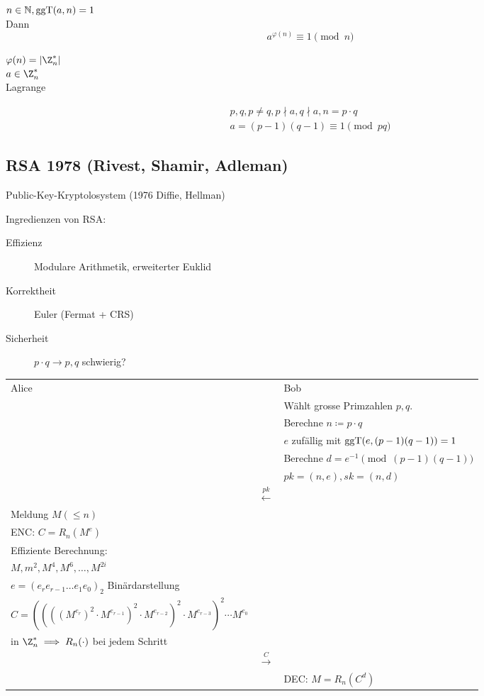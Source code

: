 \begin{satz*}[note = (Euler)]
	$n \in \mathbb{N} , \operatorname{ggT}(a,n) = 1$ \\
	Dann
	\[ a^{\varphi(n)} \equiv 1 \pmod n \]
	\begin{bew}
		$\varphi(n) = \abs{\Z_n^*}$\\
		$a \in \Z_n^*$\\
		Lagrange
	\end{bew}
\end{satz*}
\begin{bsp*}
	\begin{gather*}
		p , q , p \neq q , p \nmid a , q \nmid a , n = p \cdot q \\
		a = (p-1)(q-1) \equiv 1 \pmod {pq}
	\end{gather*}
\end{bsp*}

\subsection{RSA 1978 (Rivest, Shamir, Adleman)}
Public-Key-Kryptolosystem (1976 Diffie, Hellman)

Ingredienzen von RSA:
\begin{description}
	\item[Effizienz] Modulare Arithmetik, erweiterter Euklid
	\item[Korrektheit] Euler (Fermat + CRS)
	\item[Sicherheit] $p \cdot q \rightarrow p , q$ schwierig?
\end{description}
\begin{tabularx}{\textwidth}{ X c X }
	Alice								&		&Bob								\\
&&	Wählt grosse Primzahlen $p , q$.													\\
&&	Berechne $n \coloneqq p \cdot q$												\\
&&	$e$ zufällig mit $\operatorname{ggT}(e,(p-1)(q-1)) = 1$											\\
&&	Berechne $d = e^{-1} \pmod{(p-1)(q-1)}$											\\
&&	$pk = (n,e) , sk = (n,d)$														\\
&	$\overset{pk}{\leftarrow}$														&\\
	Meldung $M (\leq n)$															&&\\
	ENC: $C = R_n(M^e)$															&&\\
	Effiziente Berechnung:															&&\\
	$M , m^2 , M^4 , M^6 , \dotsc , M^{2i}$												&&\\
	$e = (e_r e_{r-1} \dots e_1 e_0)_2$ Binärdarstellung									&&\\
	$C = ((((M^{e_r})^2 \cdot M^{e_{r-1}})^2 \cdot M^{e_{r-2}})^2 \cdot M^{e_{r-3}})^2 \dotsm M^{e_0}$ 	&&\\
	in $\Z_n^* \implies R_n(\cdot)$ bei jedem Schritt										&&\\
&	$\overset{C}{\rightarrow}$														&\\
&&	DEC: $M = R_n(C^d)$															
\end{tabularx}

